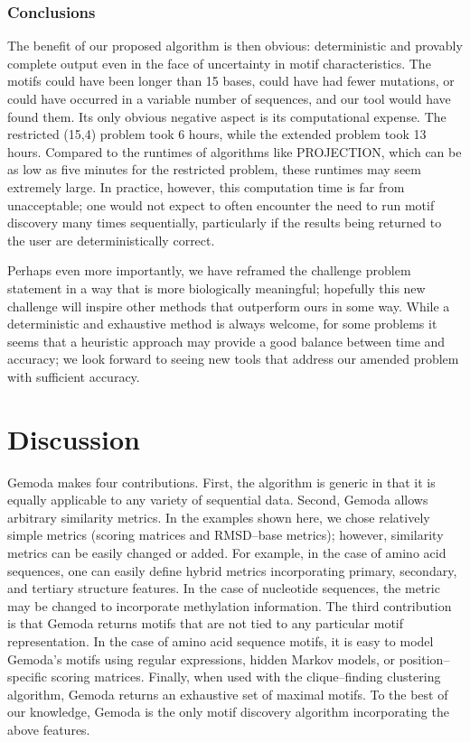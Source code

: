 \subsubsection{Conclusions}
    The benefit of our proposed algorithm is then obvious:
    deterministic and provably complete
    output even in the face of uncertainty in motif characteristics.  The motifs
    could have been longer than 15 bases, could have had fewer mutations, or
    could have occurred in a variable number of sequences, and our tool would
    have found them.  Its only obvious negative aspect is its
    computational expense.  The restricted (15,4) problem took 6 hours, while the
    extended problem took 13 hours.  Compared to the runtimes of algorithms
    like PROJECTION, which can be as low as five minutes for the restricted
    problem, these runtimes may seem extremely large.  In practice, however, this
    computation time is far from unacceptable; one would not expect to often
    encounter the need to run motif discovery many times sequentially,
    particularly if the results being returned to the user are
    deterministically correct.

    Perhaps even more importantly, we have reframed the challenge problem
    statement in a way that is more biologically meaningful; hopefully this
    new challenge will inspire other methods that outperform ours in some way.
    While a deterministic and exhaustive method is always welcome,
    for some problems it seems that a heuristic approach may provide a
    good balance between time and accuracy; we look forward to seeing
    new tools that address our amended problem with sufficient accuracy.




\section{Discussion}

Gemoda makes four contributions.  First, the
algorithm is generic in that it is equally applicable to
any variety of sequential data.  Second, Gemoda allows
arbitrary similarity metrics.  In the examples shown here,
we chose relatively simple metrics (scoring matrices and
RMSD--base metrics); however, similarity metrics can
be easily changed or added. For example, in the case of amino acid
sequences, one can easily define hybrid metrics
incorporating primary, secondary, and tertiary structure
features.  In the case of nucleotide sequences,
the metric may be changed to incorporate methylation information.
The third contribution is that Gemoda
returns motifs that are not tied
to any particular motif representation.  In
the case of amino acid sequence motifs, it is easy to model
Gemoda's motifs using regular expressions, hidden Markov
models, or position--specific scoring matrices.  Finally,
when used with the clique--finding clustering algorithm,
Gemoda returns an exhaustive set of maximal motifs.
To the best of our knowledge, Gemoda is the only motif discovery
algorithm incorporating the above features.

